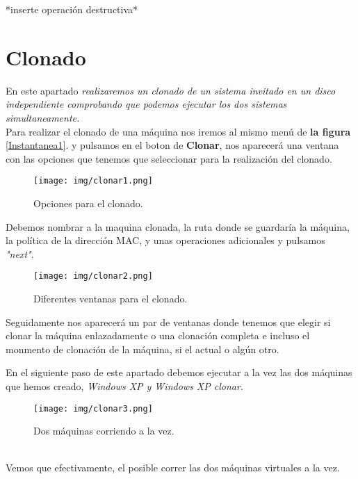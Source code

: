 \documentclass[12pt]{article}
\begin{document}
      \newpage

      *inserte operación destructiva*

      \newpage
    
    \section{Clonado}
      En este apartado \textit{realizaremos un clonado de un sistema invitado en un disco independiente comprobando que 
      podemos ejecutar los dos sistemas simultaneamente.}
      \\
      Para realizar el clonado de una máquina nos iremos al mismo menú de \textbf{la figura }\ref{Instantanea1}.
      y pulsamos en el boton de \textbf{Clonar}, nos aparecerá una ventana con las opciones que tenemos que seleccionar 
      para la realización del clonado.
      \begin{figure}[h]
        \centering
        \texttt{[image: img/clonar1.png]}
        \caption{Opciones para el clonado.}
        \label{Clonado1}
      \end{figure}
      Debemos nombrar a la maquina clonada, la ruta donde se guardaría la máquina, la política de la dirección MAC, y unas 
      operaciones adicionales y pulsamos \textit{"next"}.
      \begin{figure}[h]
        \centering
        \texttt{[image: img/clonar2.png]}
        \caption{Diferentes ventanas para el clonado.}
        \label{Clonado2}
      \end{figure}
      Seguidamente nos aparecerá un par de ventanas donde tenemos que elegir si clonar la máquina enlazadamente o una clonación 
      completa e incluso el monmento de clonación de la máquina, si el actual o algún otro.

      \newpage

      En el siguiente paso de este apartado debemos ejecutar a la vez las dos máquinas que hemos creado, \textit{Windows XP y Windows XP clonar}.
      \begin{figure}[h]
        \centering
        \texttt{[image: img/clonar3.png]}
        \caption{Dos máquinas corriendo a la vez.}
        \label{Clonado3}
      \end{figure}
      \\
      Vemos que efectivamente, el posible correr las dos máquinas virtuales a la vez.

      \newpage
\end{document}
